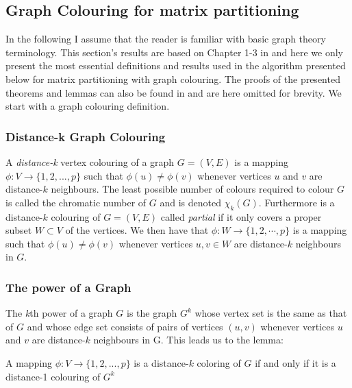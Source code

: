 	
	\subsection{Graph Colouring for matrix partitioning}
	\label{sec:partitioning}
	In the following I assume that the reader is familiar with basic graph theory
	terminology. 
	This section's results are based on Chapter 1-3 in \cite{Jacobian} and here
	we  only present the most essential definitions and results used in the
	algorithm presented 
	below for matrix partitioning with graph colouring. The proofs of the presented
	theorems and lemmas 
	can also be found in \cite{Jacobian} and are here omitted for brevity.
	We start with a graph colouring definition. 
	\subsubsection*{Distance-k Graph Colouring}
	\begin{definition}
		A \textit{distance-k} vertex colouring of a graph $G = (V,E)$ is a mapping $\phi
		: V \to \{1,2,..., p\}$ such that $\phi(u) \not= \phi(v)$ whenever vertices $u$
		and $v$ are distance-$k$ neighbours. The least possible number of colours
		required to colour $G$ is called the chromatic number of $G$ and is denoted
		$\chi_k(G)$. Furthermore is a distance-$k$ colouring of $G = (V,E)$ called
		\emph{partial} if it only covers a proper subset $W \subset V$ of the vertices.
		We then have that $\phi: W \to \{1,2, \cdots, p\}$ is a mapping such that 
		$\phi(u) \not= \phi(v)$ whenever vertices $u, v \in W$ are distance-$k$
		neighbours in $G$.  
	\end{definition}
	
	\subsubsection*{The power of a Graph}
	\begin{definition}
		The \emph{k}th power of a graph $G$ is the graph $G^k$ whose vertex set is the
		same as that of $G$ and whose edge set consists of pairs of vertices $(u,v)$
		whenever vertices $u$ and $v$ are distance-$k$ neighbours in G. 
		This leads us to the  lemma:
	\end{definition}
	\begin{lemma}
		A mapping $\phi : V \to \{1,2,..., p\}$ is a distance-$k$ coloring of $G$ if and
		only if it is a distance-1 colouring of $G^k$
	\end{lemma}
	
